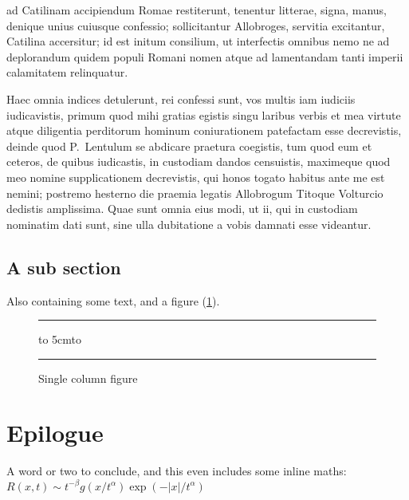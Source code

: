 \documentclass[letterpaper]{ifacmtg}
\begin{document}
ad Catilinam accipiendum Romae restiterunt, tenentur litterae, signa,
manus, denique unius cuiusque confessio; sollicitantur Allobroges,
servitia excitantur, Catilina accersitur; id est initum consilium, ut
interfectis omnibus nemo ne ad deplorandum quidem populi Romani nomen
atque ad lamentandam tanti imperii calamitatem relinquatur. \par Haec omnia
indices detulerunt, rei confessi sunt, vos multis iam iudiciis
iudicavistis, primum quod mihi gratias egistis singu laribus verbis et
mea virtute atque diligentia perditorum hominum coniurationem patefactam
esse decrevistis, deinde quod P.~Lentulum se abdicare praetura
coegistis, tum quod eum et ceteros, de quibus iudicastis, in custodiam
dandos censuistis, maximeque quod meo nomine supplicationem decrevistis,
qui honos togato habitus ante me est nemini; postremo hesterno die
praemia legatis Allobrogum Titoque Volturcio dedistis amplissima. Quae
sunt omnia eius modi, ut ii, qui in custodiam nominatim dati sunt, sine
ulla dubitatione a vobis damnati esse videantur.

\subsection{A sub section}
Also containing some text, and a figure (\ref{f1}).
\begin{figure}
\hrule
\vbox to 5cm{\vfill \hbox to \vfill}
\hrule
\caption{Single column figure}
\label{f1}
\end{figure}

\section{Epilogue}
A word or two to conclude,  and this even includes some
inline maths: \(R(x,t)\sim
t^{-\beta}g(x/t^\alpha)\exp(-|x|/t^\alpha)\)
\end{document}
